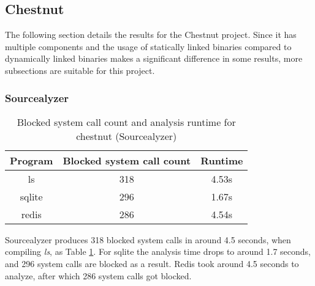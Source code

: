 \subsection {Chestnut}
The following section details the results for the Chestnut project.
Since it has multiple components and the usage of statically linked binaries compared to dynamically linked binaries makes a significant difference in some results, more subsections are suitable for this project.

\subsubsection {Sourcealyzer}
\begin{table}[!h]
\begin{center}
\caption{Blocked system call count and analysis runtime for chestnut (Sourcealyzer)}
\label{tbl:chestnut_src_results}
\begin{tabular}{||c c c||} 
 \hline
 Program & Blocked system call count & Runtime \\
 \hline\hline
 ls & 318 & 4.53s \\ 
 \hline
 sqlite & 296 & 1.67s \\ 
 \hline
 redis & 286 & 4.54s \\ 
 \hline
\end{tabular}
\end{center}
\end{table}
Sourcealyzer produces 318 blocked system calls in around 4.5 seconds, when compiling \textit{ls}, as Table \ref{tbl:chestnut_src_results}.
For sqlite the analysis time drops to around 1.7 seconds, and 296 system calls are blocked as a result.
Redis took around 4.5 seconds to analyze, after which 286 system calls got blocked.

